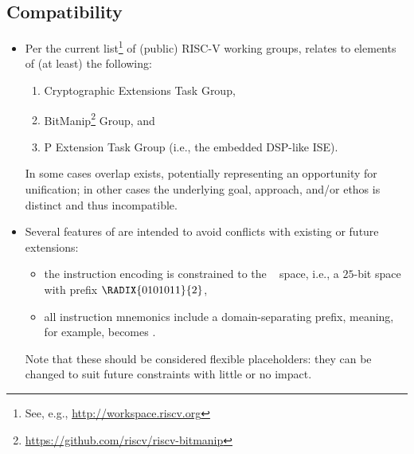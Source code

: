 
\subsection{Compatibility}
\label{sec:bg:compatibility}

\begin{itemize}

\item Per the current list\footnote{
      See, e.g., \url{http://workspace.riscv.org}
      } of (public) RISC-V working groups, 
      \XCID relates to elements of (at least) the following:

      \begin{enumerate}
      \item Cryptographic Extensions Task Group,
      \item BitManip\footnote{
            \url{https://github.com/riscv/riscv-bitmanip}
            }                             Group,
            and
      \item P             Extension  Task Group (i.e., the embedded DSP-like ISE).
      \end{enumerate}

      \noindent
      In some cases overlap exists, potentially representing an opportunity
      for unification; in other cases the underlying goal, approach, and/or
      ethos is distinct and thus incompatible.

\item Several features of \XCID are intended to avoid conflicts with existing 
      or future extensions:

      \begin{itemize}
      \item the instruction encoding is constrained to the 
            ~\cite[Table 19.1]{SCARV:RV:ISA:I:17}
            space, i.e., a $25$-bit space with prefix $\RADIX{0101011}{2}$,
      \item all instruction mnemonics include a domain-separating prefix,
            meaning, for example,  becomes .
      \end{itemize}
      
      \noindent
      Note that these should be considered flexible placeholders: they can
      be changed to suit future constraints with little or no impact.

\end{itemize}

